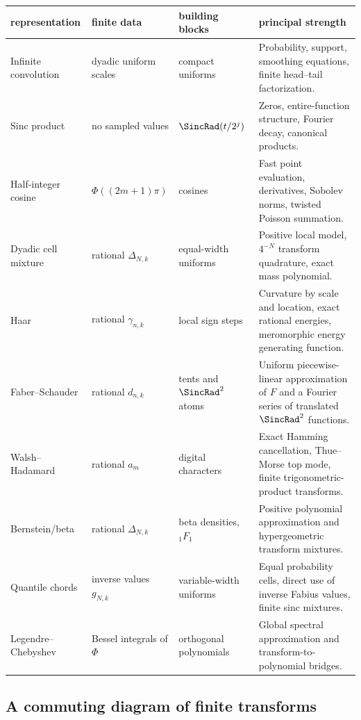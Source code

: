 \documentclass[11pt]{article}
\theoremstyle{definition}
\theoremstyle{remark}
\begin{document}
\begin{longtable}{@{}p{}p{}p{}p{}@{}}
\toprule
representation & finite data & building blocks & principal strength\\
\midrule
\endhead
Infinite convolution & dyadic uniform scales & compact uniforms & Probability,
support, smoothing equations, finite head--tail factorization.\\
Sinc product & no sampled values & $\SincRad(t/2^j)$ & Zeros, entire-function
structure, Fourier decay, canonical products.\\
Half-integer cosine & $\Phi((2m+1)\pi)$ & cosines & Fast point evaluation,
derivatives, Sobolev norms, twisted Poisson summation.\\
Dyadic cell mixture & rational $\Delta_{N,k}$ & equal-width uniforms & Positive
local model, $4^{-N}$ transform quadrature, exact mass polynomial.\\
Haar & rational $\gamma_{n,k}$ & local sign steps & Curvature by scale and
location, exact rational energies, meromorphic energy generating function.\\
Faber--Schauder & rational $d_{n,k}$ & tents and $\SincRad^2$ atoms & Uniform
piecewise-linear approximation of $F$ and a Fourier series of translated
$\SincRad^2$ functions.\\
Walsh--Hadamard & rational $a_m$ & digital characters & Exact Hamming
cancellation, Thue--Morse top mode, finite trigonometric-product transforms.\\
Bernstein/beta & rational $\Delta_{N,k}$ & beta densities, ${}_1F_1$ & Positive
polynomial approximation and hypergeometric transform mixtures.\\
Quantile chords & inverse values $g_{N,k}$ & variable-width uniforms & Equal
probability cells, direct use of inverse Fabius values, finite sinc mixtures.\\
Legendre--Chebyshev & Bessel integrals of $\Phi$ & orthogonal polynomials &
Global spectral approximation and transform-to-polynomial bridges.\\
\bottomrule
\end{longtable}

\subsection{A commuting diagram of finite transforms}
\end{document}
